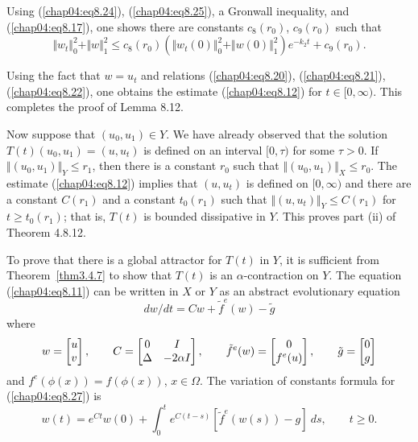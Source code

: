 \documentclass{surv-l}
\theoremstyle{plain}
\theoremstyle{definition}
\numberwithin{equation}{section}
\numberwithin{figure}{chapter}
\begin{document}
Using (\ref{chap04:eq8.24}), (\ref{chap04:eq8.25}), a Gronwall inequality, and (\ref{chap04:eq8.17}), one shows there are constants $c_{8}(r_{0})$, $c_{9}(r_{0})$ such that
\begin{equation}\label{chap04:eq8.26}
\Vert w_{t}\Vert_{0}^{2}+\Vert w\Vert_{1}^{2}\leq c_{8}(r_{0})(\Vert w_{t}(0)\Vert_{0}^{2}+\Vert w(0)\Vert_{1}^{2})e^{-k_{2}t}+c_{9}(r_{0}).
\end{equation}

Using the fact that $w=u_{t}$ and relations (\ref{chap04:eq8.20}), (\ref{chap04:eq8.21}), (\ref{chap04:eq8.22}), one obtains the estimate (\ref{chap04:eq8.12}) for $t\in[0, \infty)$. This completes the proof of Lemma 8.12.

Now suppose that $(u_{0}, u_{1})\in Y$. We have already observed that the solution $T(t)(u_{0}, u_{1})=(u, u_{t})$ is defined on an interval $[0, \tau)$ for some $\tau>0$. If $\Vert(u_{0}, u_{1})\Vert_{Y}\leq r_{1}$, then there is a constant $r_{0}$ such that $\Vert(u_{0}, u_{1})\Vert_{X}\leq r_{0}$. The estimate (\ref{chap04:eq8.12}) implies that $(u, u_{t})$ is defined on $[0, \infty)$ and there are a constant $C(r_{1})$ and a constant $t_{0}(r_{1})$ such that $\Vert(u, u_{t})\Vert_{Y}\leq C(r_{1})$ for $t\geq t_{0}(r_{1})$; that is, $T(t)$ is bounded dissipative in $Y$. This proves part (ii) of Theorem 4.8.12.

To prove that there is a global attractor for $T(t)$ in $Y$, it is sufficient from Theorem~\ref{thm3.4.7} to show that $T(t)$ is an $\alpha$-contraction on $Y$. The equation (\ref{chap04:eq8.11}) can be written in $X$ or $Y$ as an abstract evolutionary equation
\begin{equation}\label{chap04:eq8.27}
dw/dt=Cw+\tilde{f}^{e}(w)-\tilde{g}
\end{equation}
where
\begin{align}\label{chap04:eq8.28}
w=\left[\begin{array}{@{}l@{}}
u\\
v
\end{array}\right],\qquad C=\left[\begin{array}{@{}cc@{}}
0 & I\\
\Delta & -2\alpha I
\end{array}\right],\qquad \tilde{f}^{e}(w)=\left[\begin{array}{@{}c@{}}
0\\
f^{e}(u)
\end{array}\right],\qquad \tilde{g}=\left[\begin{array}{@{}l@{}}
0\\
g
\end{array}\right]
\end{align}
and $f^{e}(\phi(x))=f(\phi(x))$, $ x\in\Omega$. The variation of constants formula for (\ref{chap04:eq8.27}) is
\begin{equation}\label{chap04:eq8.29}
w(t)=e^{Ct}w(0)+\int_{0}^{t}e^{C(t-s)}[\tilde{f}^{e}(w(s))-g]\ ds,\qquad t\geq 0.
\end{equation}
\end{document}
